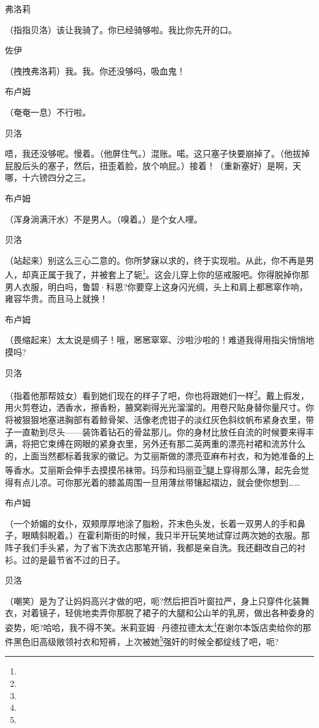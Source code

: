\par 弗洛莉
\par （指指贝洛）该让我骑了。你已经骑够啦。我比你先开的口。
\par 佐伊
\par （拽拽弗洛莉）我。我。你还没够吗，吸血鬼！
\par 布卢姆
\par （奄奄一息）不行啦。
\par 贝洛
\par 唔，我还没够呢。慢着。（他屏住气。）混账。喏。这只塞子快要崩掉了。（他拔掉屁股后头的塞子，然后，扭歪着脸，放个响屁。）接着！（重新塞好）是啊，天哪，十六镑四分之三。
\par 布卢姆
\par （浑身淌满汗水）不是男人。（嗅着。）是个女人哩。
\par 贝洛
\par （站起来）别这么三心二意的。你所梦寐以求的，终于实现啦。从此，你不再是男人，却真正属于我了，并被套上了轭\footnote{}。这会儿穿上你的惩戒服吧。你得脱掉你那男人衣服，明白吗，鲁碧·科恩?你要穿上这身闪光绸，头上和肩上都窸窣作响，雍容华贵。而且马上就换！
\par 布卢姆
\par （畏缩起来）太太说是绸子！哦，窸窸窣窣、沙啦沙啦的！难道我得用指尖悄悄地摸吗?
\par 贝洛
\par （指着他那帮妓女）看到她们现在的样子了吧，你也将跟她们一样\footnote{}。戴上假发，用火剪卷边，洒香水，擦香粉，腋窝剃得光光溜溜的。用卷尺贴身替你量尺寸。你将被狠狠地塞进胸部有着鲸骨架、活像老虎钳子的淡红灰色斜纹帆布紧身衣里，带子一直勒到尽头——装饰着钻石的骨盆那儿。你的身材比放任自流的时候要来得丰满，将把它束缚在网眼的紧身衣里，另外还有那二英两重的漂亮衬裙和流苏什么的，上面当然都标着我家的徽记。为艾丽斯做的漂亮亚麻布衬衣，和为她准备的上等香水。艾丽斯会伸手去摸摸吊袜带。玛莎和玛丽亚\footnote{}腿上穿得那么薄，起先会觉得有点儿凉。可你那光着的膝盖周围一旦用薄丝带镶起褶边，就会使你想到……
\par 布卢姆
\par （一个娇媚的女仆，双颊厚厚地涂了脂粉，芥末色头发，长着一双男人的手和鼻子，眼睛斜睨着。）在霍利斯街的时候，我只半开玩笑地试穿过两次她的衣服。那阵子我们手头紧，为了省下洗衣店那笔开销，我都是亲自洗。我还翻改自己的衬衫。过的是最节省不过的日子。
\par 贝洛
\par （嘲笑）是为了让妈妈高兴才做的吧，呃?然后把百叶窗拉严，身上只穿件化装舞衣，对着镜子，轻佻地卖弄你那脱了裙子的大腿和公山羊的乳房，做出各种委身的姿势，呃?哈哈，我不得不笑。米莉亚姆·丹德拉德太太\footnote{}在谢尔本饭店卖给你的那件黑色旧高级敞领衬衣和短裤，上次被她\footnote{}强奸的时候全都绽线了吧，呃?

